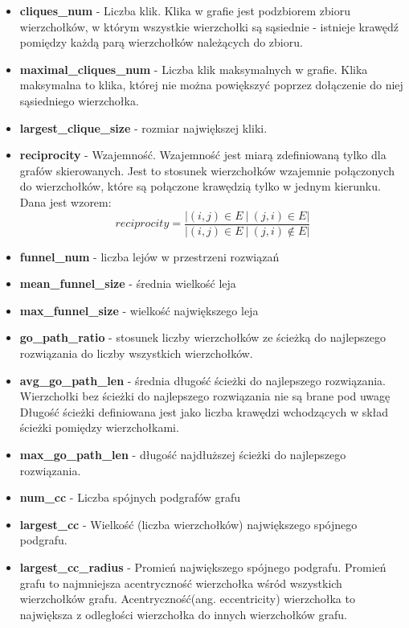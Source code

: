 \begin{itemize}
      \item \textbf{cliques\_num} - Liczba klik. Klika w grafie jest podzbiorem zbioru wierzchołków, w którym wszystkie wierzchołki są sąsiednie - istnieje krawędź pomiędzy każdą parą wierzchołków należących do zbioru.
      \item \textbf{maximal\_cliques\_num} - Liczba klik maksymalnych w grafie. Klika maksymalna to klika, której nie można powiększyć poprzez dołączenie do niej sąsiedniego wierzchołka.
      \item \textbf{largest\_clique\_size} - rozmiar największej kliki.
      \item \textbf{reciprocity} - Wzajemność. Wzajemność jest miarą zdefiniowaną tylko dla grafów skierowanych. Jest to stosunek wierzchołków wzajemnie połączonych do wierzchołków, które są połączone krawędzią tylko w jednym kierunku.
            Dana jest wzorem:
            \begin{equation}
                  \label{eq:reciprocity}
                  reciprocity = \frac{ |(i, j) \in E  \: | \: (j, i) \in E| }{|(i, j) \in E  \: | \: (j, i) \notin E| }
            \end{equation}
      \item \textbf{funnel\_num} - liczba lejów w przestrzeni rozwiązań
      \item \textbf{mean\_funnel\_size} - średnia wielkość leja
      \item \textbf{max\_funnel\_size} - wielkość największego leja
      \item \textbf{go\_path\_ratio} - stosunek liczby wierzchołków ze ścieżką do najlepszego rozwiązania do liczby wszystkich wierzchołków.
      \item \textbf{avg\_go\_path\_len} - średnia długość ścieżki do najlepszego rozwiązania. Wierzchołki bez ścieżki do najlepszego rozwiązania nie są brane pod uwagę
            Długość ścieżki definiowana jest jako liczba krawędzi wchodzących w skład ścieżki pomiędzy wierzchołkami.
      \item \textbf{max\_go\_path\_len} - długość najdłuższej ścieżki do najlepszego rozwiązania.
      \item \textbf{num\_cc} - Liczba spójnych podgrafów grafu
      \item \textbf{largest\_cc} - Wielkość (liczba wierzchołków) największego spójnego podgrafu.
      \item \textbf{largest\_cc\_radius} - Promień największego spójnego podgrafu. Promień grafu to najmniejsza acentryczność wierzchołka wśród wszystkich wierzchołków grafu.
            Acentryczność(ang. eccentricity) wierzchołka to największa z odległości wierzchołka do innych wierzchołków grafu.
\end{itemize}

